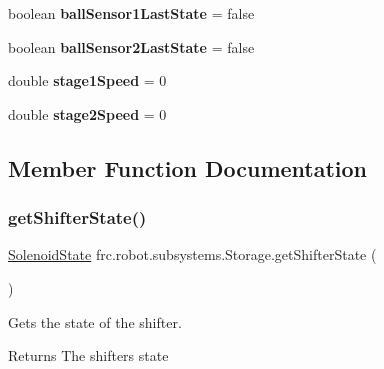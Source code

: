 \begin{DoxyCompactItemize}
boolean {\bfseries ball\+Sensor1\+Last\+State} = false
\item 
\mbox{\label{classfrc_1_1robot_1_1subsystems_1_1_storage_a6f96c81842019845c05884adc4542c0b}} 
boolean {\bfseries ball\+Sensor2\+Last\+State} = false
\item 
\mbox{\label{classfrc_1_1robot_1_1subsystems_1_1_storage_a85bba87da73ddd15c811b7e1e297afe3}} 
double {\bfseries stage1\+Speed} = 0
\item 
\mbox{\label{classfrc_1_1robot_1_1subsystems_1_1_storage_a6b4e935a71216d5fbb557ab819d7a891}} 
double {\bfseries stage2\+Speed} = 0
\end{DoxyCompactItemize}


\subsection{Member Function Documentation}
\mbox{\label{classfrc_1_1robot_1_1subsystems_1_1_storage_a61cb0ae0e4883d56dd40e226f0984a16}} 
\subsubsection{\texorpdfstring{getShifterState()}{getShifterState()}}
{\footnotesize\ttfamily \mbox{\hyperlink{enumfrc_1_1robot_1_1enums_1_1_solenoid_state}{Solenoid\+State}} frc.\+robot.\+subsystems.\+Storage.\+get\+Shifter\+State (\begin{DoxyParamCaption}{ }\end{DoxyParamCaption})\hspace{0.3cm}{\ttfamily [inline]}}



Gets the state of the shifter. 

\begin{DoxyReturn}{Returns}
The shifter\textquotesingle{}s state 
\end{DoxyReturn}
\mbox{\label{classfrc_1_1robot_1_1subsystems_1_1_storage_a9efeea1d8a13c4a1df74aaf02c6ac466}} 
